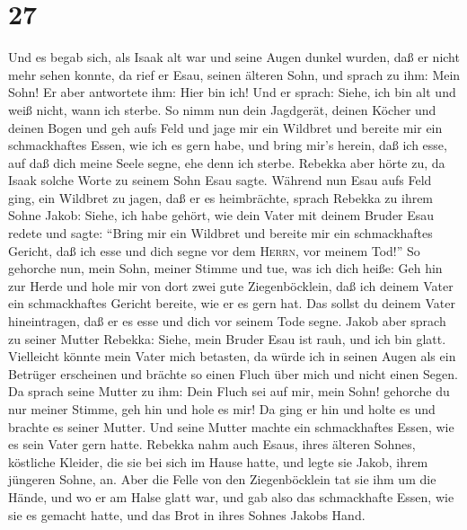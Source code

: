 \hypertarget{section-26}{%
\section{27}\label{section-26}}

 Und es begab sich, als Isaak alt war und seine Augen
dunkel wurden, daß er nicht mehr sehen konnte, da rief er Esau, seinen
älteren Sohn, und sprach zu ihm: Mein Sohn! Er aber antwortete ihm: Hier
bin ich!  Und er sprach: Siehe, ich bin alt und weiß
nicht, wann ich sterbe.  So nimm nun dein Jagdgerät,
deinen Köcher und deinen Bogen und geh aufs Feld und jage mir ein
Wildbret  und bereite mir ein schmackhaftes Essen, wie ich
es gern habe, und bring mir's herein, daß ich esse, auf daß dich meine
Seele segne, ehe denn ich sterbe.  Rebekka aber hörte zu,
da Isaak solche Worte zu seinem Sohn Esau sagte.  Während
nun Esau aufs Feld ging, ein Wildbret zu jagen, daß er es heimbrächte,
 sprach Rebekka zu ihrem Sohne Jakob: Siehe, ich habe
gehört, wie dein Vater mit deinem Bruder Esau redete und sagte: ``Bring
mir ein Wildbret und bereite mir ein schmackhaftes Gericht, daß ich esse
und dich segne vor dem \textsc{Herrn}, vor meinem Tod!'' 
So gehorche nun, mein Sohn, meiner Stimme und tue, was ich dich heiße:
 Geh hin zur Herde und hole mir von dort zwei gute
Ziegenböcklein, daß ich deinem Vater ein schmackhaftes Gericht bereite,
wie er es gern hat.  Das sollst du deinem Vater
hineintragen, daß er es esse und dich vor seinem Tode segne.
 Jakob aber sprach zu seiner Mutter Rebekka: Siehe, mein
Bruder Esau ist rauh, und ich bin glatt.  Vielleicht
könnte mein Vater mich betasten, da würde ich in seinen Augen als ein
Betrüger erscheinen und brächte so einen Fluch über mich und nicht einen
Segen.  Da sprach seine Mutter zu ihm: Dein Fluch sei auf
mir, mein Sohn! gehorche du nur meiner Stimme, geh hin und hole es mir!
 Da ging er hin und holte es und brachte es seiner
Mutter. Und seine Mutter machte ein schmackhaftes Essen, wie es sein
Vater gern hatte.  Rebekka nahm auch Esaus, ihres älteren
Sohnes, köstliche Kleider, die sie bei sich im Hause hatte, und legte
sie Jakob, ihrem jüngeren Sohne, an.  Aber die Felle von
den Ziegenböcklein tat sie ihm um die Hände, und wo er am Halse glatt
war,  und gab also das schmackhafte Essen, wie sie es
gemacht hatte, und das Brot in ihres Sohnes Jakobs Hand. 
